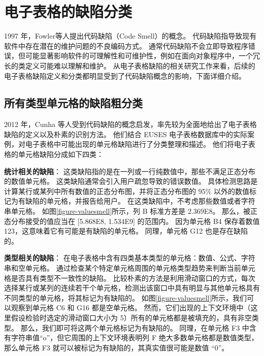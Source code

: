 \section{电子表格的缺陷分类}
1997 年，Fowler等人\cite{fowler1997refactoring}提出代码缺陷（Code Smell）的概念。
代码缺陷指导致现有软件中存在潜在的维护问题的不良编码方式。
通常代码缺陷不会立即导致程序错误，但可能显著影响软件的可理解性和可维护性，例如在面向对象程序中，一个冗长的类定义可能难以理解和维护。
从电子表格缺陷的相关研究工作来看，后续的电子表格缺陷定义和分类都明显受到了代码缺陷概念的影响，下面详细介绍。

\subsection{所有类型单元格的缺陷粗分类}
2012 年，Cunha 等人\cite{cunha2012towards}受到代码缺陷的概念启发，率先较为全面地给出了电子表格缺陷的定义以及朴素的识别方法。
他们结合 EUSES 电子表格数据库中的实际案例，对电子表格中可能出现的单元格缺陷进行了分类整理和描述。
他们将电子表格的单元格缺陷分成如下四类：

\textbf{统计相关的缺陷}：
这类缺陷指的是在一列或一行纯数值中，那些不满足正态分布的数值单元格。
这类缺陷通常会引入用户疏忽导致的错误数值。
具体检测思路是计算某行或某列中所有数值的正态分布图，并将正态分布图的 95\% 以外的数值标记为有缺陷的单元格，并报告给用户。
在这类缺陷中，不考虑那些数值或者字符串单元格。
如图\ref{figure-valuesmell}所示，列 B 标准方差是 2.369E8。
那么，被正态分布接受的值应当在 [5.868E8, 1.534E9] 的范围内。
因为单元格 B4 保存着数值 123，这意味着它有可能是有缺陷的单元格。
同理，单元格 G12 也是存在缺陷的。

\textbf{类型相关的缺陷}：
在电子表格中含有四类基本类型的单元格：数值、公式、字符串和空单元格。
通过检查某个特定单元格周围的单元格类型趋势来判断当前单元格是否具有类型不一致性的缺陷。
比较朴素的方法是利用滑动窗口的方式，每次选择某行或某列的连续若干个单元格，检测出该窗口中具有明显与其他单元格具有不同类型的单元格，将其标记为有缺陷的。
如图\ref{figure-valuesmell}所示，我们可以观察到单元格 C6 和 G16 都是空单元格。
然而，它们出现的上下文环境中（这里假设检验时选定的滑动窗口大小为 5）所有的单元格都是被填充的，具有非空类型。
那么，我们即可将这两个单元格标记为有缺陷的。
同理，在单元格 F3 中含有字符串值“o”，但它周围的上下文环境表明列 F 绝大多数单元格都是数值类型，那么单元格 F3 就可以被标记为有缺陷的，其真实值很可能是数值 “0”。

